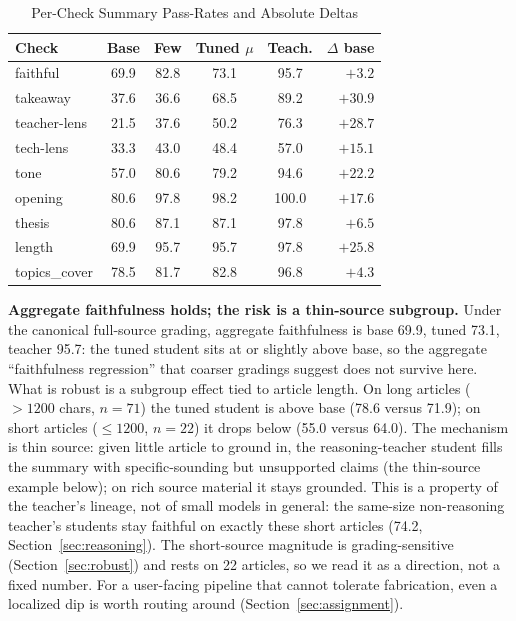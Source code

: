 \documentclass[10pt,journal]{IEEEtran}
\begin{document}
\begin{table}[t]
\centering
\caption{Per-Check Summary Pass-Rates and Absolute Deltas}
\label{tab:percheck}
\small
\footnotesize\setlength{\tabcolsep}{4.5pt}\begin{tabular}{@{}lccccr@{}}
\toprule
Check & Base & Few & Tuned $\mu$ & Teach. & $\Delta$ base \\
\midrule
faithful & 69.9 & 82.8 & 73.1 & 95.7 & $+3.2$ \\
takeaway & 37.6 & 36.6 & 68.5 & 89.2 & $+30.9$ \\
teacher-lens & 21.5 & 37.6 & 50.2 & 76.3 & $+28.7$ \\
tech-lens & 33.3 & 43.0 & 48.4 & 57.0 & $+15.1$ \\
tone & 57.0 & 80.6 & 79.2 & 94.6 & $+22.2$ \\
opening & 80.6 & 97.8 & 98.2 & 100.0 & $+17.6$ \\
thesis & 80.6 & 87.1 & 87.1 & 97.8 & $+6.5$ \\
length & 69.9 & 95.7 & 95.7 & 97.8 & $+25.8$ \\
topics\_cover & 78.5 & 81.7 & 82.8 & 96.8 & $+4.3$ \\
\bottomrule
\end{tabular}
\end{table}

\textbf{Aggregate faithfulness holds; the risk is a thin-source subgroup.}\label{sec:faithful}
Under the canonical full-source grading, aggregate faithfulness is base 69.9, tuned 73.1, teacher 95.7: the tuned student sits at or slightly above base, so the aggregate ``faithfulness regression'' that coarser gradings suggest does not survive here. What is robust is a subgroup effect tied to article length. On long articles ($>1200$ chars, $n=71$) the tuned student is above base (78.6 versus 71.9); on short articles ($\leq1200$, $n=22$) it drops below (55.0 versus 64.0). The mechanism is thin source: given little article to ground in, the reasoning-teacher student fills the summary with specific-sounding but unsupported claims (the thin-source example below); on rich source material it stays grounded. This is a property of the teacher's lineage, not of small models in general: the same-size non-reasoning teacher's students stay faithful on exactly these short articles (74.2, Section~\ref{sec:reasoning}). The short-source magnitude is grading-sensitive (Section~\ref{sec:robust}) and rests on 22 articles, so we read it as a direction, not a fixed number. For a user-facing pipeline that cannot tolerate fabrication, even a localized dip is worth routing around (Section~\ref{sec:assignment}).
\end{document}

